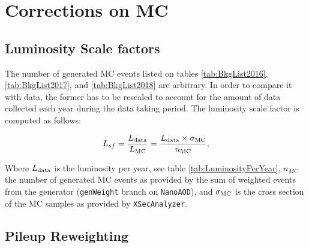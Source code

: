 \section{Corrections on MC}

\subsection{Luminosity Scale factors}

The number of generated MC events listed on tables \ref{tab:BkgList2016}, \ref{tab:BkgList2017},
and \ref{tab:BkgList2018} are arbitrary. In order to compare it with data, the
former has to be rescaled to account for the amount of data collected each year
during the data taking period. The luminosity scale factor is computed as follows:

\begin{equation}
  L_{sf}=\frac{L_{\rm data}}{L_{\rm MC}} = \frac{L_{\rm data}\times\sigma_{\rm MC}}{n_{\rm MC}},
\label{eq:lumiSF}
\end{equation}

Where $L_{\rm data}$ is the luminosity per year, see table \ref{tab:LuminosityPerYear},
$n_{MC}$ the number of generated MC events as provided by the sum of weighted events
from the generator (\verb|genWeight| branch on \verb|NanoAOD|), and $\sigma_{\rm MC}$
is the cross section of the MC samples as provided by \verb|XSecAnalyzer|.

\subsection{Pileup Reweighting}


